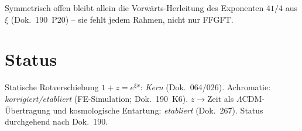 Symmetrisch offen bleibt allein die Vorwärts-Herleitung des Exponenten $41/4$ aus
$\xi$ (Dok.~190~P20) -- sie fehlt jedem Rahmen, nicht nur FFGFT.

\section*{Status}

Statische Rotverschiebung $1+z=e^{\xi x}$: \emph{Kern} (Dok.~064/026).
Achromatie: \emph{korrigiert/etabliert} (FE-Simulation; Dok.~190~K6).
$z\to$Zeit als $\Lambda$CDM-Übertragung und kosmologische Entartung:
\emph{etabliert} (Dok.~267). Status durchgehend nach Dok.~190.
